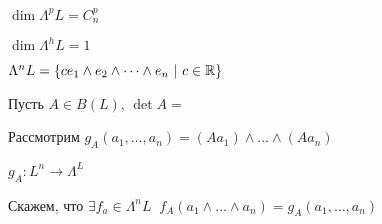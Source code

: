     \par $ $
    \par $\dim \Lambda^p L = C_n^p$
    \par $\dim \Lambda^h L = 1$
    \par $\Lambda^n L = \{c e_1 \wedge e_2 \wedge \dots \wedge e_n \ | \ c \in \mathbb{R} \}$
    \par Пусть $A \in B(L)$, $\det A = $
    \par Рассмотрим $g_A(a_1, \dots, a_n) = (Aa_1) \wedge \dots \wedge (Aa_n)$
    \par $g_A : L^n \rightarrow \Lambda^ L$
    \par Скажем, что $\exists f_a \in \Lambda^n L \ $ $f_A(a_1 \wedge \dots \wedge a_n) = g_A(a_1, \dots, a_n)$

